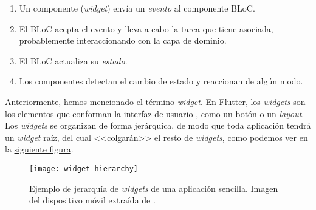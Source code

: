 \vspace{-0.3cm}
\begin{enumerate}
	\item Un componente (\emph{widget}) envía un \emph{evento} al componente BLoC.
	\item El BLoC acepta el evento y lleva a cabo la tarea que tiene asociada, probablemente interaccionando con la capa de dominio.
	\item El BLoC actualiza su \emph{estado}.
	\item Los componentes detectan el cambio de estado y reaccionan de algún modo.
\end{enumerate}

Anteriormente, hemos mencionado el término \emph{widget}. En Flutter, los \emph{widgets} son los elementos que conforman la interfaz de usuario \cite{flutter-widget}, como un botón o un \emph{layout}. Los \emph{widgets} se organizan de forma jerárquica, de modo que toda aplicación tendrá un \emph{widget} raíz, del cual <<colgarán>> el resto de \emph{widgets}, como podemos ver en la \hyperref[flutter-widgets]{siguiente figura}.

\begin{figure}[!h]
	\centering
	\texttt{[image: widget-hierarchy]}
	\caption[Ejemplo de jerarquía de \emph{widgets}.]{Ejemplo de jerarquía de \emph{widgets} de una aplicación sencilla. Imagen del dispositivo móvil extraída de \cite{miola20}.}
	\label{flutter-widgets}
\end{figure}

